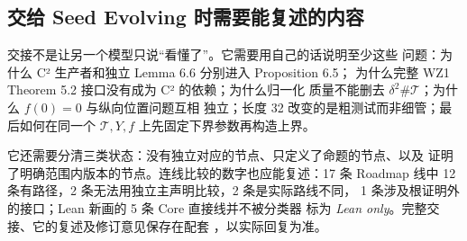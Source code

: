 \documentclass[UTF8,11pt,a4paper,fontset=none]{ctexart}
\newcommand{\T}{\mathcal T}
\begin{document}
\subsection{交给 Seed Evolving 时需要能复述的内容}

交接不是让另一个模型只说“看懂了”。它需要用自己的话说明至少这些
问题：为什么 C² 生产者和独立 Lemma 6.6 分别进入 Proposition 6.5；
为什么完整 WZ1 Theorem 5.2 接口没有成为 C² 的依赖；为什么归一化
质量不能删去 $\delta^2\#\T$；为什么 $f(0)=0$ 与纵向位置问题互相
独立；长度 32 改变的是粗测试而非细管；最后如何在同一个
$\T,Y,f$ 上先固定下界参数再构造上界。

它还需要分清三类状态：没有独立对应的节点、只定义了命题的节点、以及
证明了明确范围内版本的节点。连线比较的数字也应能复述：17 条 Roadmap
线中 12 条有路径，2 条无法用独立主声明比较，2 条是实际路线不同，
1 条涉及根证明外的接口；Lean 新画的 5 条 Core 直接线并不被分类器
标为 \emph{Lean only}。完整交接、它的复述及修订意见保存在配套
，以实际回复为准。
\end{document}
